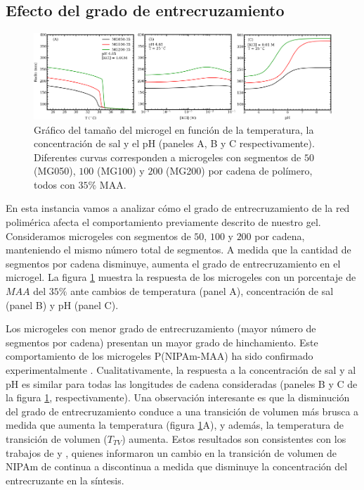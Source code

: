 \subsection{Efecto del grado de entrecruzamiento} \label{sec:gel:entrecruzamiento}


\begin{figure}[!tb]
	\centering
	\includegraphics[width=1\linewidth]{Figures/graph-gel/R-all_xlink.pdf}
	\caption{Gr\'afico del tama\~no del microgel en funci\'on de la temperatura, la concentraci\'on de sal y el pH (paneles A, B y C respectivamente).
		Diferentes curvas corresponden a microgeles con segmentos de $50$ (MG050), $100$ (MG100) y $200$ (MG200) por cadena de pol\'imero, todos con $35\%$ MAA.}
	\label{fig:gel:R_xlink}
\end{figure}

En esta instancia vamos a analizar c\'omo el grado de entrecruzamiento de la red polim\'erica afecta el comportamiento previamente descrito de nuestro gel. Consideramos microgeles con segmentos de $50$, $100$ y $200$ por cadena, manteniendo el mismo n\'umero total de segmentos. A medida que la cantidad de segmentos por cadena disminuye, aumenta el grado de entrecruzamiento en el microgel. La figura \ref{fig:gel:R_xlink} muestra la respuesta de los microgeles con un porcentaje de $MAA$ del $35\%$ ante cambios de temperatura (panel A), concentraci\'on de sal (panel B) y pH (panel C).

Los microgeles con menor grado de entrecruzamiento (mayor n\'umero de segmentos por cadena) presentan un mayor grado de hinchamiento. Este comportamiento de los microgeles P(NIPAm-MAA) ha sido confirmado experimentalmente \cite{khan2013preparation}. Cualitativamente, la respuesta a la concentraci\'on de sal y al pH es similar para todas las longitudes de cadena consideradas (paneles B y C de la figura \ref{fig:gel:R_xlink}, respectivamente). Una observaci\'on interesante es que la disminuci\'on del grado de entrecruzamiento conduce a una transici\'on de volumen m\'as brusca a medida que aumenta la temperatura (figura \ref{fig:gel:R_xlink}A), y adem\'as, la temperatura de transici\'on de volumen ($T_{TV}$) aumenta. Estos resultados son consistentes con los trabajos de \citet{li1989study} y \citet{wu1997volume}, quienes informaron un cambio en la transici\'on de volumen de NIPAm de continua a discontinua a medida que disminuye la concentraci\'on del entrecruzante en la s\'intesis.

